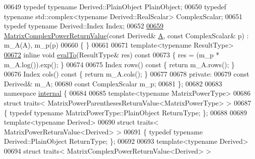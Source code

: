 \begin{DoxyCode}
00649     \textcolor{keyword}{typedef} \textcolor{keyword}{typename} Derived::PlainObject PlainObject;
00650     \textcolor{keyword}{typedef} \textcolor{keyword}{typename} std::complex<typename Derived::RealScalar> ComplexScalar;
00651     \textcolor{keyword}{typedef} \textcolor{keyword}{typename} Derived::Index Index;
00652 
\hyperlink{class_eigen_1_1_matrix_complex_power_return_value_a3e5903e22f70e9deb07c3967ae52fd54}{00659}     \hyperlink{class_eigen_1_1_matrix_complex_power_return_value_a3e5903e22f70e9deb07c3967ae52fd54}{MatrixComplexPowerReturnValue}(\textcolor{keyword}{const} Derived& \hyperlink{group___core___module_class_eigen_1_1_matrix}{A}, \textcolor{keyword}{const} ComplexScalar& p) :
       m\_A(A), m\_p(p)
00660     \{ \}
00661 
00671     \textcolor{keyword}{template}<\textcolor{keyword}{typename} ResultType>
\hyperlink{class_eigen_1_1_matrix_complex_power_return_value_aac9c4065d4711e62af085633a38c4416}{00672}     \textcolor{keyword}{inline} \textcolor{keywordtype}{void} \hyperlink{class_eigen_1_1_matrix_complex_power_return_value_aac9c4065d4711e62af085633a38c4416}{evalTo}(ResultType& res)\textcolor{keyword}{ const}
00673 \textcolor{keyword}{    }\{ res = (m\_p * m\_A.log()).exp(); \}
00674 
00675     Index rows()\textcolor{keyword}{ const }\{ \textcolor{keywordflow}{return} m\_A.rows(); \}
00676     Index cols()\textcolor{keyword}{ const }\{ \textcolor{keywordflow}{return} m\_A.cols(); \}
00677 
00678   \textcolor{keyword}{private}:
00679     \textcolor{keyword}{const} Derived& m\_A;
00680     \textcolor{keyword}{const} ComplexScalar m\_p;
00681 \};
00682 
00683 \textcolor{keyword}{namespace }\hyperlink{namespaceinternal}{internal} \{
00684 
00685 \textcolor{keyword}{template}<\textcolor{keyword}{typename} MatrixPowerType>
00686 \textcolor{keyword}{struct }traits< MatrixPowerParenthesesReturnValue<MatrixPowerType> >
00687 \{ \textcolor{keyword}{typedef} \textcolor{keyword}{typename} MatrixPowerType::PlainObject ReturnType; \};
00688 
00689 \textcolor{keyword}{template}<\textcolor{keyword}{typename} Derived>
00690 \textcolor{keyword}{struct }traits< MatrixPowerReturnValue<Derived> >
00691 \{ \textcolor{keyword}{typedef} \textcolor{keyword}{typename} Derived::PlainObject ReturnType; \};
00692 
00693 \textcolor{keyword}{template}<\textcolor{keyword}{typename} Derived>
00694 \textcolor{keyword}{struct }traits< MatrixComplexPowerReturnValue<Derived> >

\end{DoxyCode}
